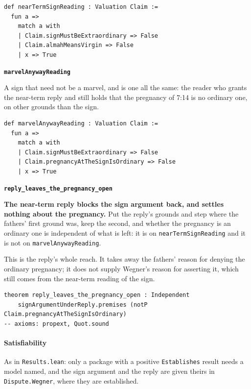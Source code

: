 \documentclass[11pt]{article}
\begin{document}
{\small\begin{verbatim}
def nearTermSignReading : Valuation Claim :=
  fun a =>
    match a with
    | Claim.signMustBeExtraordinary => False
    | Claim.almahMeansVirgin => False
    | x => True
\end{verbatim}}
\par\medskip\noindent\textbf{\texttt{marvel\allowbreak{}Anyway\allowbreak{}Reading}}\par\nobreak\noindent
A sign that need not be a marvel, and is one all the same: the reader who grants the near-term reply and still holds that the pregnancy of 7:14 is no ordinary one, on other grounds than the sign.

{\small\begin{verbatim}
def marvelAnywayReading : Valuation Claim :=
  fun a =>
    match a with
    | Claim.signMustBeExtraordinary => False
    | Claim.pregnancyAtTheSignIsOrdinary => False
    | x => True
\end{verbatim}}
\par\medskip\noindent\textbf{\texttt{reply\_\allowbreak{}leaves\_\allowbreak{}the\_\allowbreak{}pregnancy\_\allowbreak{}open}}\par\nobreak\noindent
\textbf{The near-term reply blocks the sign argument back, and settles nothing about the pregnancy.} Put the reply's grounds and step where the fathers' first ground was, keep the second, and whether the pregnancy is an ordinary one is independent of what is left: it is on \texttt{near\allowbreak{}Term\allowbreak{}Sign\allowbreak{}Reading} and it is not on \texttt{marvel\allowbreak{}Anyway\allowbreak{}Reading}.

This is the reply's whole reach. It takes away the fathers' reason for denying the ordinary pregnancy; it does not supply Wegner's reason for asserting it, which still comes from the near-term reading of the sign.

{\small\begin{verbatim}
theorem reply_leaves_the_pregnancy_open : Independent
    signArgumentUnderReply.premises (notP Claim.pregnancyAtTheSignIsOrdinary)
-- axioms: propext, Quot.sound
\end{verbatim}}
\paragraph*{Satisfiability}
\leavevmode\par
As in \texttt{Results.lean}: only a package with a positive \texttt{Establishes} result needs a model named, and the sign argument and the reply are given theirs in \texttt{Dispute.Wegner}, where they are established.
\end{document}
